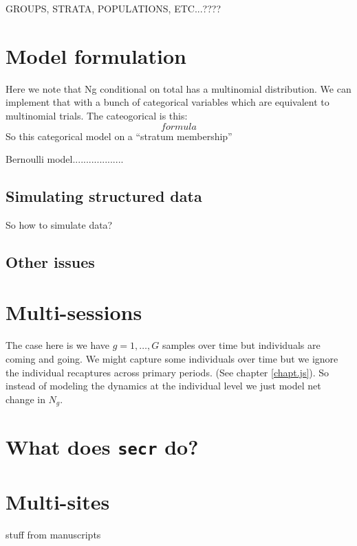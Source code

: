 GROUPS, STRATA, POPULATIONS, ETC...????

\section{Model formulation}

Here we note that Ng conditional on total has a multinomial
distribution. We can implement that with a bunch of categorical
variables which are equivalent to multinomial trials.  The
cateogorical is this:
\[
formula
\]
So this categorical model on a ``stratum membership''

Bernoulli model...................

\subsection{Simulating structured data}

So how to simulate data?


\subsection{Other issues}


\section{Multi-sessions}

The case here is we have $g=1,\ldots,G$ samples over time but
individuals are coming and going.
We might capture some individuals over time but we ignore the
individual recaptures across primary periods. (See chapter
\ref{chapt.js}). So instead of modeling the dynamics at the individual
level we just model net change in $N_{g}$.


\section{What does \mbox{\tt secr} do?}



\section{Multi-sites}


stuff from manuscripts





